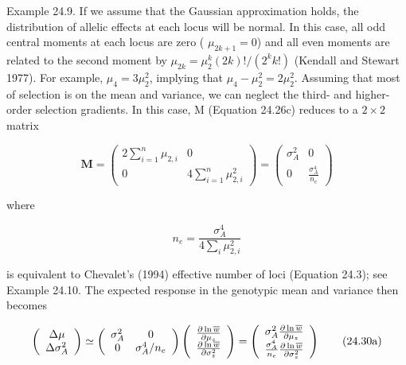 \documentclass{article}
\begin{document}
Example 24.9. If we assume that the Gaussian approximation holds, the distribution of allelic effects at each locus will be normal. In this case, all odd central moments at each locus are zero ( $ \mu_{2k+1} = 0 $) and all even moments are related to the second moment by  $ \mu_{2k} = \mu_2^k (2k)! / (2^k k!) $ (Kendall and Stewart 1977). For example,  $ \mu_4 = 3\mu_2^2 $, implying that  $ \mu_4 - \mu_2^2 = 2\mu_2^2 $. Assuming that most of selection is on the mean and variance, we can neglect the third- and higher-order selection gradients. In this case, M (Equation 24.26c) reduces to a  $ 2 \times 2 $ matrix

\begin{equation}
\mathbf{M}=\begin{pmatrix}{{{2\displaystyle\sum_{i=1}^{n}\mu_{2,i}}}}&{{{0}}} \\{{{0}}}&{{{4\displaystyle\sum_{i=1}^{n}\mu_{2,i}^{2}}}}\end{pmatrix}=\begin{pmatrix}{{{\sigma_{A}^{2}}}}&{{{0}}} \\{{{0}}}&{{{\frac{\sigma_{A}^{4}}{n_{e}}}}}\end{pmatrix}
\tag{24.29a}
\label{eq:24_29a}
\end{equation}

where

\begin{equation}
n_{e}=\frac{\sigma_{A}^{4}}{4\sum_{i}\mu_{2,i}^{2}}
\tag{24.29b}
\label{eq:24_29b}
\end{equation}

is equivalent to Chevalet's (1994) effective number of loci (Equation 24.3); see Example 24.10. The expected response in the genotypic mean and variance then becomes

\begin{equation}
\left(\begin{array}{c}{{{\Delta\mu}}} \\{{{\Delta\sigma_{A}^{2}}}}\end{array}\right)\simeq\left(\begin{array}{c c}{{{\sigma_{A}^{2}}}}&{{{0}}} \\{{{0}}}&{{{\sigma_{A}^{4}/n_{e}}}}\end{array}\right)\left(\begin{array}{c}{{{\frac{\partial\ln\overline{w}}{\partial\mu_{z}}}}} \\{{{\frac{\partial\ln\overline{w}}{\partial\sigma_{z}^{2}}}}}\end{array}\right)=\left(\begin{array}{c}{{{\sigma_{A}^{2}\frac{\partial\ln\overline{w}}{\partial\mu_{z}}}}} \\{{{\frac{\sigma_{A}^{4}}{n_{e}}\frac{\partial\ln\overline{w}}{\partial\sigma_{z}^{2}}}}}\end{array}\right)
\tag{24.30a}
\label{eq:24_30a}
\end{equation}
\end{document}
